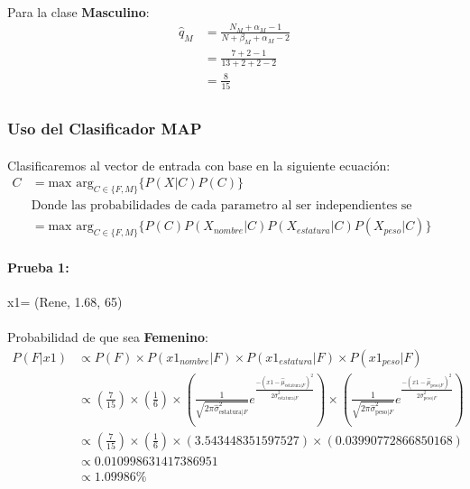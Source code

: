 \documentclass[12pt]{article}
\begin{document}
\paragraph{}Para la clase \textbf{Masculino}:
\begin{equation}
\begin{split}
\hat{q}_M &= \frac{N_M + \alpha_M - 1}{N + \beta_M + \alpha_M - 2}\\
&= \frac{7 + 2 - 1}{13 + 2 + 2 - 2}\\
&= \frac{8}{15}\\
\end{split}
\end{equation}
\clearpage
\pagebreak
\subsubsection{Uso del Clasificador MAP}
\paragraph{} Clasificaremos al vector de entrada con base en la siguiente ecuación:
\begin{equation}
\begin{split}
C &= \text{max arg}_{C\in\{F,M\}} \{ P(X|C)P(C)\} \\
&\text{Donde las probabilidades de cada parametro al ser independientes se multiplicaran}\\
&= \text{max arg}_{C\in\{F,M\}} \{ P(C) P(X_{nombre}|C)P(X_{estatura}|C)P(X_{peso}|C)\}
\end{split}
\end{equation}
\paragraph{Prueba 1: }x1= (Rene, 1.68, 65)
\paragraph{}Probabilidad de que sea \textbf{Femenino}:\\
\begin{equation}
\begin{split}
P(F|x1) &\propto P(F) \times P(x1_{nombre}|F) \times P(x1_{estatura}|F) \times P(x1_{peso}|F) \\
&\propto (\frac{7}{15}) \times (\frac{1}{6}) \times (\frac{1}{\sqrt{2\pi\hat{\sigma}_{\text{estatura}|F}^2}}e^{\frac{-(x1 - \hat{\mu}_{\text{estatura}|F})^2}{2\hat{\sigma}_{\text{estatura}|F}^2}}) \times (\frac{1}{\sqrt{2\pi\hat{\sigma}_{\text{peso}|F}^2}}e^{\frac{-(x1 - \hat{\mu}_{\text{peso}|F})^2}{2\hat{\sigma}_{\text{peso}|F}^2}}) \\
&\propto (\frac{7}{15}) \times (\frac{1}{6}) \times (3.543448351597527) \times (0.03990772866850168) \\
&\propto 0.010998631417386951 \\
&\propto 1.09986\% \\
\end{split}
\end{equation}
\end{document}
